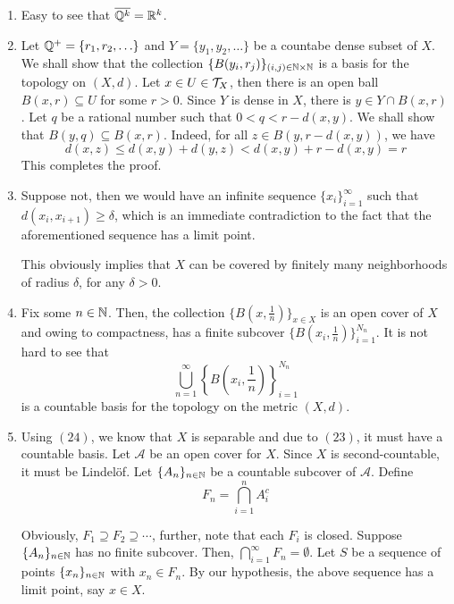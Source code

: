 \begin{enumerate}
\item Easy to see that $\overline{\mathbb{Q}^k} = \mathbb{R}^k$.

\item Let $\mathbb{Q}^+ = \{r_1,r_2,\ldots\}$ and $Y = \{y_1,y_2,\ldots\}$ be a countabe dense subset of $X$. We shall show that the collection $\{B(y_i,r_j)\}_{(i,j)\in\mathbb{N}\times\mathbb{N}}$ is a basis for the topology on $(X,d)$. Let $x\in U\in\mathcal{T}_X$, then there is an open ball $B(x,r)\subseteq U$ for some $r > 0$. Since $Y$ is dense in $X$, there is $y\in Y\cap B(x,r)$. Let $q$ be a rational number such that $0 < q < r - d(x,y)$. We shall show that $B(y, q)\subseteq B(x,r)$. Indeed, for all $z\in B(y, r - d(x,y))$, we have 
\begin{equation*}
    d(x,z)\le d(x,y) + d(y,z) < d(x,y) + r - d(x,y) = r
\end{equation*}
This completes the proof.

\item Suppose not, then we would have an infinite sequence $\{x_i\}_{i = 1}^\infty$ such that $d(x_i, x_{i + 1})\ge\delta$, which is an immediate contradiction to the fact that the aforementioned sequence has a limit point.

This obviously implies that $X$ can be covered by finitely many neighborhoods of radius $\delta$, for any $\delta > 0$.


\item Fix some $n\in\mathbb{N}$. Then, the collection $\{B(x,\frac{1}{n})\}_{x\in X}$ is an open cover of $X$ and owing to compactness, has a finite subcover $\{B(x_i,\frac{1}{n})\}_{i = 1}^{N_n}$. It is not hard to see that 
\begin{equation*}
    \bigcup_{n = 1}^\infty\left\{B(x_i,\frac{1}{n})\right\}_{i = 1}^{N_n}
\end{equation*}
is a countable basis for the topology on the metric $(X,d)$.

\item Using $(24)$, we know that $X$ is separable and due to $(23)$, it must have a countable basis. Let $\mathscr A$ be an open cover for $X$. Since $X$ is second-countable, it must be Lindel\"of. Let $\{A_n\}_{n\in\mathbb{N}}$ be a countable subcover of $\mathscr A$. Define 
\begin{equation*}
    F_n = \bigcap_{i = 1}^n A_i^c
\end{equation*}

Obviously, $F_1\supseteq F_2\supseteq\cdots$, further, note that each $F_i$ is closed. Suppose $\{A_n\}_{n\in\mathbb{N}}$ has no finite subcover. Then, $\bigcap_{i = 1}^\infty F_n = \emptyset$. Let $S$ be a sequence of points $\{x_n\}_{n\in\mathbb{N}}$ with $x_n\in F_n$. By our hypothesis, the above sequence has a limit point, say $x\in X$.


\end{enumerate}

